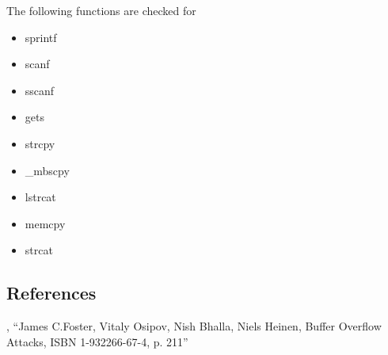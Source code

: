 The following functions are checked for

\begin{itemize}
\item sprintf
\item scanf
\item sscanf
\item gets
\item strcpy
\item \_mbscpy
\item lstrcat
\item memcpy
\item strcat
\end{itemize}

\subsection{References}

 , ``James C.Foster, Vitaly Osipov, Nish Bhalla, Niels Heinen, Buffer Overflow Attacks, ISBN 1-932266-67-4, p. 211''

